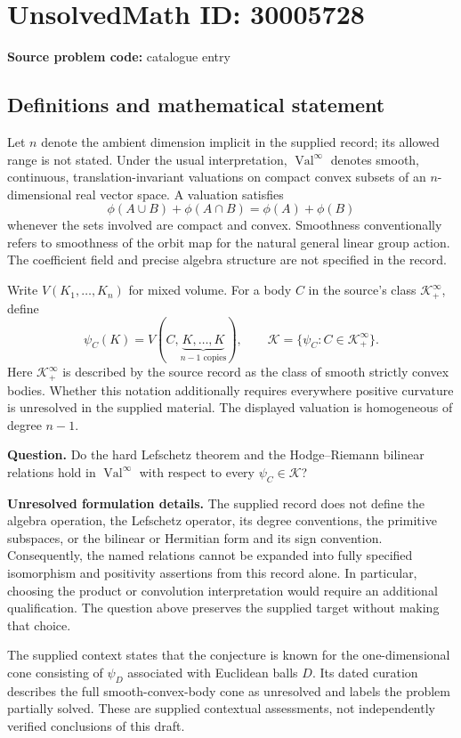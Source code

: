 \documentclass[11pt]{article}
\begin{document}
\section*{UnsolvedMath ID: 30005728}
\textbf{Source problem code:} catalogue entry
\subsection{Definitions and mathematical statement}
Let \(n\) denote the ambient dimension implicit in the supplied record; its allowed range is not stated. Under the usual interpretation, \(\operatorname{Val}^{\infty}\) denotes smooth, continuous, translation-invariant valuations on compact convex subsets of an \(n\)-dimensional real vector space. A valuation satisfies
\[
\phi(A\cup B)+\phi(A\cap B)=\phi(A)+\phi(B)
\]
whenever the sets involved are compact and convex. Smoothness conventionally refers to smoothness of the orbit map for the natural general linear group action. The coefficient field and precise algebra structure are not specified in the record.

Write \(V(K_1,\ldots,K_n)\) for mixed volume. For a body \(C\) in the source's class \(\mathcal K_+^{\infty}\), define
\[
\psi_C(K)=V(C,\underbrace{K,\ldots,K}_{n-1\text{ copies}}),
\qquad
\mathcal K=\{\psi_C:C\in\mathcal K_+^{\infty}\}.
\]
Here \(\mathcal K_+^{\infty}\) is described by the source record as the class of smooth strictly convex bodies. Whether this notation additionally requires everywhere positive curvature is unresolved in the supplied material. The displayed valuation is homogeneous of degree \(n-1\).

\textbf{Question.} Do the hard Lefschetz theorem and the Hodge--Riemann bilinear relations hold in \(\operatorname{Val}^{\infty}\) with respect to every \(\psi_C\in\mathcal K\)?

\textbf{Unresolved formulation details.} The supplied record does not define the algebra operation, the Lefschetz operator, its degree conventions, the primitive subspaces, or the bilinear or Hermitian form and its sign convention. Consequently, the named relations cannot be expanded into fully specified isomorphism and positivity assertions from this record alone. In particular, choosing the product or convolution interpretation would require an additional qualification. The question above preserves the supplied target without making that choice.

The supplied context states that the conjecture is known for the one-dimensional cone consisting of \(\psi_D\) associated with Euclidean balls \(D\). Its dated curation describes the full smooth-convex-body cone as unresolved and labels the problem partially solved. These are supplied contextual assessments, not independently verified conclusions of this draft.
\end{document}
